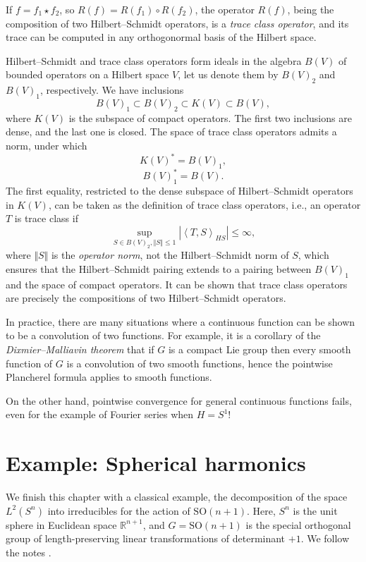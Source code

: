 \begin{remark}
 \label{remark-traceclass}
If $f = f_1 \star f_2$, so $R(f) = R(f_1)\circ R(f_2)$, the operator $R(f)$, being the composition of two Hilbert--Schmidt operators, is a \emph{trace class operator}, and its trace can be computed in any orthogonormal basis of the Hilbert space. 

Hilbert--Schmidt and trace class operators form ideals in the algebra $B(V)$ of bounded operators on a Hilbert space $V$, let us denote them by $B(V)_2$ and $B(V)_1$, respectively. We have inclusions
$$ B(V)_1\subset B(V)_2 \subset K(V) \subset B(V),$$
where $K(V)$ is the subspace of compact operators. The first two inclusions are dense, and the last one is closed. The space of trace class operators admits a norm, under which
$$ K(V)^* = B(V)_1,$$
$$ B(V)_1^* = B(V).$$
The first equality, restricted to the dense subspace of Hilbert--Schmidt operators in $K(V)$, can be taken as the definition of trace class operators, i.e., an operator $T$ is trace class if
$$ \sup_{S\in B(V)_2, \Vert S\Vert\le 1} |\left< T, S\right>_{HS}| \le \infty,$$
where $\Vert S\Vert$ is the \emph{operator norm}, not the Hilbert--Schmidt norm of $S$, which ensures that the Hilbert--Schmidt pairing extends to a pairing between $B(V)_1$ and the space of compact operators. It can be shown that trace class operators are precisely the compositions of two Hilbert--Schmidt operators.

In practice, there are many situations where a continuous function can be shown to be a convolution of two functions. For example, it is a corollary of the \emph{Dixmier--Malliavin theorem} that if $G$ is a compact Lie group then every smooth function of $G$ is a convolution of two smooth functions, hence the pointwise Plancherel formula applies to smooth functions.

On the other hand, pointwise convergence for general continuous functions fails, even for the example of Fourier series when $H=S^1$!
\end{remark}


\section{Example: Spherical harmonics}
\label{section-spherical-harmonics}

We finish this chapter with a classical example, the decomposition of the space $L^2(S^n)$ into irreducibles for the action of $\text{SO}(n+1)$. Here, $S^n$ is the unit sphere in Euclidean space $\mathbb R^{n+1}$, and $G=\text{SO}(n+1)$ is the special orthogonal group of length-preserving linear transformations of determinant $+1$. We follow the notes \cite{Gallier}.

